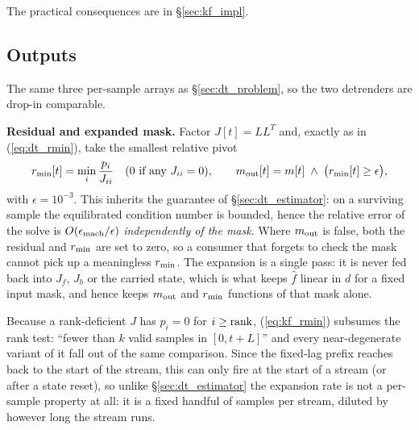 \documentclass{article}
\numberwithin{equation}{section}   %
\begin{document}
The practical consequences are in \S\ref{sec:kf_impl}.

\subsection{Outputs}
\label{sec:kf_outputs}

The same three per-sample arrays as \S\ref{sec:dt_problem}, so the two detrenders are drop-in comparable.

{\bf Residual and expanded mask.}  Factor $J[t] = LL^T$ and, exactly as in (\ref{eq:dt_rmin}), take the
smallest relative pivot
\begin{equation}
r_{\rm min}[t] = \min_i \frac{p_i}{J_{ii}} \quad (0 \mbox{ if any } J_{ii} = 0),
\qquad
m_{\rm out}[t] = m[t] \;\wedge\; \big(r_{\rm min}[t] \ge \epsilon\big) ,
\label{eq:kf_rmin}
\end{equation}
with $\epsilon = 10^{-3}$.  This inherits the guarantee of \S\ref{sec:dt_estimator}: on a surviving sample the
equilibrated condition number is bounded, hence the relative error of the solve is
$O(\epsilon_{\rm mach}/\epsilon)$ {\em independently of the mask}.  Where $m_{\rm out}$ is false, both the
residual and $r_{\rm min}$ are set to zero, so a consumer that forgets to check the mask cannot pick up a
meaningless $r_{\rm min}$.  The expansion is a single pass: it is never fed back into $J_f$, $J_b$ or the
carried state, which is what keeps $\hat f$ linear in $d$ for a fixed input mask, and hence keeps
$m_{\rm out}$ and $r_{\rm min}$ functions of that mask alone.

Because a rank-deficient $J$ has $p_i = 0$ for $i \ge {\rm rank}$, (\ref{eq:kf_rmin}) subsumes the rank test:
``fewer than $k$ valid samples in $[0,t+L]$'' and every near-degenerate variant of it fall out of the same
comparison.  Since the fixed-lag prefix reaches back to the start of the stream, this can only fire at the start of a
stream (or after a state reset), so unlike \S\ref{sec:dt_estimator} the expansion rate is not a per-sample
property at all: it is a fixed handful of samples per stream, diluted by however long the stream runs.
\end{document}
